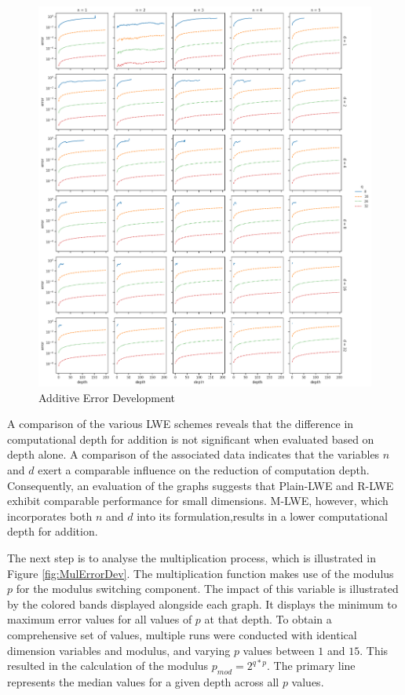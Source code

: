 \begin{figure}[htp]
  \centering
  \includegraphics[scale=0.38]{images/AddErrorDevelopment.png}
  \caption[Additive Error Development]{Additive Error Development}
  \label{fig:AddErrorDev}
\end{figure}

A comparison of the various LWE schemes reveals that the difference in computational depth for addition is not significant when evaluated based on depth alone. A comparison of the associated data indicates that the variables $n$ and $d$ exert a comparable influence on the reduction of computation depth. Consequently, an evaluation of the graphs suggests that Plain-LWE and R-LWE exhibit comparable performance for small dimensions. M-LWE, however, which incorporates both $n$ and $d$ into its formulation,results in a lower computational depth for addition.


The next step is to analyse the multiplication process, which is illustrated in Figure \ref{fig:MulErrorDev}. The multiplication function makes use of the modulus $p$ for the modulus switching component. The impact of this variable is illustrated by the colored bands displayed alongside each graph. It displays the minimum to maximum error values for all values of $p$ at that depth. To obtain a comprehensive set of values, multiple runs were conducted with identical dimension variables and modulus, and varying $p$ values between $1$ and $15$. This resulted in the calculation of the modulus $p_{mod}=2^{q*p}$. The primary line represents the median values for a given depth across all $p$ values.

